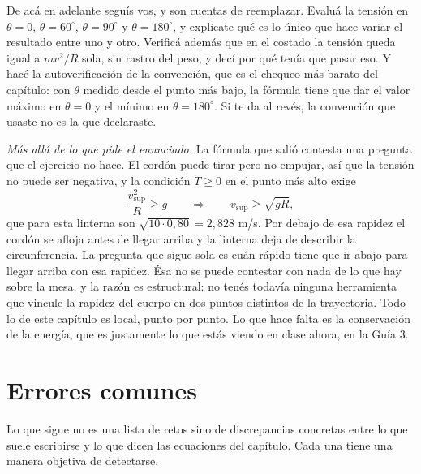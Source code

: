 \documentclass[11pt,openany]{book}
\begin{document}
\begin{ejemplo}[parcial]
De acá en adelante seguís vos, y son cuentas de reemplazar. Evaluá la tensión en $\theta = 0$, $\theta = 60^\circ$, $\theta = 90^\circ$ y $\theta = 180^\circ$, y explicate qué es lo único que hace variar el resultado entre uno y otro. Verificá además que en el costado la tensión queda igual a $m v^2/R$ sola, sin rastro del peso, y decí por qué tenía que pasar eso. Y hacé la autoverificación de la convención, que es el chequeo más barato del capítulo: con $\theta$ medido desde el punto más bajo, la fórmula tiene que dar el valor máximo en $\theta = 0$ y el mínimo en $\theta = 180^\circ$. Si te da al revés, la convención que usaste no es la que declaraste.

\medskip
\textit{Más allá de lo que pide el enunciado.} La fórmula que salió contesta una pregunta que el ejercicio no hace. El cordón puede tirar pero no empujar, así que la tensión no puede ser negativa, y la condición $T \geq 0$ en el punto más alto exige
\[
\frac{v_{\text{sup}}^2}{R} \geq g
\qquad\Longrightarrow\qquad
v_{\text{sup}} \geq \sqrt{g R} ,
\]
que para esta linterna son $\sqrt{10 \cdot 0{,}80} = 2{,}828$ m/s. Por debajo de esa rapidez el cordón se afloja antes de llegar arriba y la linterna deja de describir la circunferencia. La pregunta que sigue sola es cuán rápido tiene que ir abajo para llegar arriba con esa rapidez. Ésa no se puede contestar con nada de lo que hay sobre la mesa, y la razón es estructural: no tenés todavía ninguna herramienta que vincule la rapidez del cuerpo en dos puntos distintos de la trayectoria. Todo lo de este capítulo es local, punto por punto. Lo que hace falta es la conservación de la energía, que es justamente lo que estás viendo en clase ahora, en la Guía 3.
\end{ejemplo}

\section{Errores comunes}

Lo que sigue no es una lista de retos sino de discrepancias concretas entre lo que suele escribirse y lo que dicen las ecuaciones del capítulo. Cada una tiene una manera objetiva de detectarse.
\end{document}
